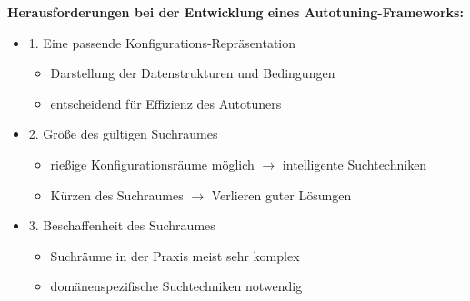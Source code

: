    \begingroup
    \begin{frame}
    \textbf{Herausforderungen bei der Entwicklung eines Autotuning-Frameworks:}
    
    \begin{itemize}
       
    \item 1. Eine passende Konfigurations-Repräsentation
        \begin{itemize}
          \item Darstellung der Datenstrukturen und Bedingungen
          \item entscheidend für Effizienz des Autotuners \newline
          
        \end{itemize}
        
    \item 2. Größe des gültigen Suchraumes
        \begin{itemize}
          \item rießige Konfigurationsräume möglich $\rightarrow$  intelligente Suchtechniken
          
          \item Kürzen des Suchraumes $\rightarrow$ Verlieren guter Lösungen \newline
          
        \end{itemize}
        
    \item 3. Beschaffenheit des Suchraumes
      \begin{itemize}
        \item Suchräume in der Praxis meist sehr komplex 
        \item domänenspezifische Suchtechniken notwendig
        
      \end{itemize}
    \end{itemize}
        
    \end{frame}
    \endgroup
    


